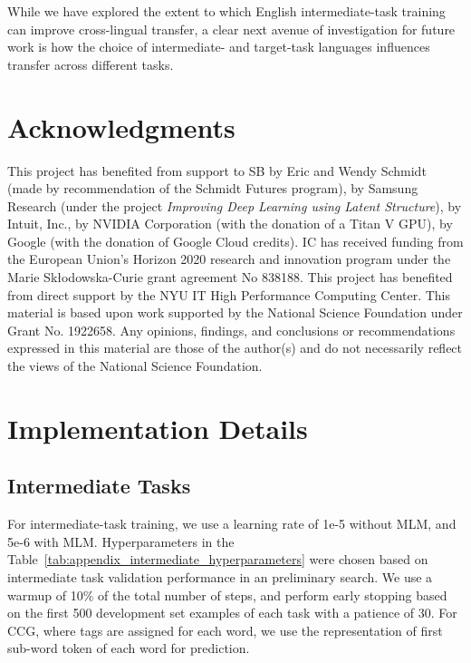 \documentclass[11pt,a4paper]{article}
\begin{document}
While we have explored the extent to which English intermediate-task training can improve cross-lingual transfer, a clear next avenue of investigation for future work is how the choice of intermediate- and target-task languages influences transfer across different tasks.



\section*{Acknowledgments}
This project has benefited from support to SB by Eric and Wendy Schmidt (made by recommendation of the Schmidt Futures program), by Samsung Research (under the project \textit{Improving Deep Learning using Latent Structure}), by Intuit, Inc.,  by NVIDIA Corporation (with the  donation of a Titan V GPU), by Google (with the donation of Google Cloud credits). 
IC has received funding from the European Union’s Horizon 2020 research and innovation program under the Marie Sk\l{}odowska-Curie grant agreement No 838188.
This project has benefited from direct support by the NYU IT High Performance Computing Center. This material is based upon work supported by the National Science Foundation under Grant No. 1922658. Any opinions, findings, and conclusions or recommendations expressed in this material are those of the author(s) and do not necessarily reflect the views of the National Science Foundation. 



\clearpage

\appendix

\section{Implementation Details}\label{appendix:A}
\subsection{Intermediate Tasks}

For intermediate-task training, we use a learning rate of 1e-5 without MLM, and 5e-6 with MLM. Hyperparameters in the Table~\ref{tab:appendix_intermediate_hyperparameters} were chosen based on  intermediate task validation performance in an preliminary search. We use a warmup of 10\% of the total number of steps, and perform early stopping based on the first 500 development set examples of each task with a patience of 30. For CCG, where tags are assigned for each word, we use the representation of first sub-word token of each word for prediction.
\end{document}
